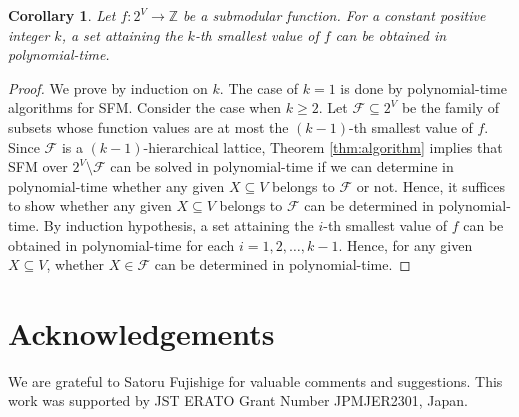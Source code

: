 \documentclass[11pt,letterpaper]{article}
\theoremstyle{plain}
\newtheorem{corollary}[theorem]{Corollary}
\theoremstyle{definition}
\begin{document}
\begin{corollary}
Let $f:2^V\to \mathbb{Z}$ be a submodular function.
For a constant positive integer $k$, a set attaining the $k$-th smallest value of $f$ can be obtained in polynomial-time.
\end{corollary}
\begin{proof}
We prove by induction on $k$.
The case of $k=1$ is done by polynomial-time algorithms for SFM.
Consider the case when $k\ge 2$.
Let $\mathcal{F}\subseteq 2^V$ be the family of subsets whose function values are at most the $(k-1)$-th smallest value of $f$.
Since $\mathcal{F}$ is a $(k-1)$-hierarchical lattice, Theorem \ref{thm:algorithm} implies that SFM over $2^V\setminus \mathcal{F}$ can be solved in polynomial-time if we can determine in polynomial-time whether any given $X\subseteq V$ belongs to $\mathcal{F}$ or not.
Hence, it suffices to show whether any given $X\subseteq V$ belongs to $\mathcal{F}$ can be determined in polynomial-time.
By induction hypothesis, a set attaining the $i$-th smallest value of $f$ can be obtained in polynomial-time for each $i=1,2,\ldots,k-1$.
Hence, for any given $X\subseteq V$, whether $X\in \mathcal{F}$ can be determined in polynomial-time.
\end{proof}

\section*{Acknowledgements}
We are grateful to Satoru Fujishige for valuable comments and suggestions.
This work was supported by JST ERATO Grant Number JPMJER2301, Japan.



\end{document}
